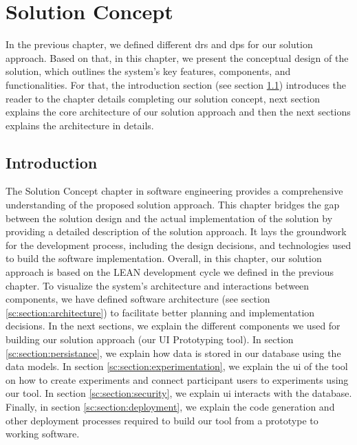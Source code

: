 
\chapter{Solution Concept}

\ifpdf
    \graphicspath{{Chapters/Solution-Concept/Figs/}{Chapters/Solution-Concept/Figs/}{Chapters/Solution-Concept/Figs/}}
\else
    \graphicspath{{Chapters/Solution-Concept/Figs/}{Chapters/Solution-Concept/Figs/}}
\fi
In the previous chapter, we defined different \ac{dr}s and \ac{dp}s for our solution approach. 
Based on that, in this chapter, we present the conceptual design of the solution, which outlines the system's key features, components, and functionalities. 
For that, the introduction section (see section \ref{sc:section:introduction}) introduces the reader to the chapter details completing our solution concept, next section explains the core architecture of our solution approach and then the next sections explains the architecture in details. 

\section{Introduction}
\label{sc:section:introduction}
The Solution Concept chapter in software engineering provides a comprehensive understanding of the proposed solution approach. 
This chapter bridges the gap between the solution design and the actual implementation of the solution by providing a detailed description of the solution approach. 
It lays the groundwork for the development process, including the design decisions, and technologies used to build the software implementation. 
Overall, in this chapter, our solution approach is based on the LEAN development cycle we defined in the previous chapter.
To visualize the system's architecture and interactions between components, we have defined software architecture (see section \ref{sc:section:architecture}) to facilitate better planning and implementation decisions.
In the next sections, we explain the different components we used for building our solution approach (our UI Prototyping tool). 
In section \ref{sc:section:persistance}, we explain how data is stored in our database using the data models. 
In section \ref{sc:section:experimentation}, we explain the \ac{ui} of the tool on how to create experiments and connect participant users to experiments using our tool.
In section \ref{sc:section:security}, we explain \ac{ui} interacts with the database. 
Finally, in section \ref{sc:section:deployment}, we explain the code generation and other deployment processes required to build our tool from a prototype to working software.


